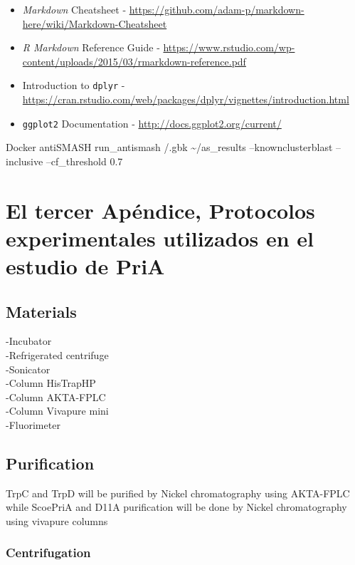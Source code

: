 \documentclass[]{article}
\begin{document}
\begin{itemize}
\item
  \emph{Markdown} Cheatsheet -
  \url{https://github.com/adam-p/markdown-here/wiki/Markdown-Cheatsheet}
\item
  \emph{R Markdown} Reference Guide -
  \url{https://www.rstudio.com/wp-content/uploads/2015/03/rmarkdown-reference.pdf}
\item
  Introduction to \texttt{dplyr} -
  \url{https://cran.rstudio.com/web/packages/dplyr/vignettes/introduction.html}
\item
  \texttt{ggplot2} Documentation -
  \url{http://docs.ggplot2.org/current/}
\end{itemize}

Docker antiSMASH run\_antismash /.gbk \textasciitilde{}/as\_results
--knownclusterblast --inclusive --cf\_threshold 0.7

\section{El tercer Apéndice, Protocolos experimentales utilizados en el
estudio de
PriA}\label{el-tercer-apendice-protocolos-experimentales-utilizados-en-el-estudio-de-pria}

\subsection{Materials}\label{materials}

-Incubator\\
-Refrigerated centrifuge\\
-Sonicator\\
-Column HisTrapHP\\
-Column AKTA-FPLC\\
-Column Vivapure mini\\
-Fluorimeter

\subsection{Purification}\label{purification}

TrpC and TrpD will be purified by Nickel chromatography using AKTA-FPLC
while ScoePriA and D11A purification will be done by Nickel
chromatography using vivapure columns

\subsubsection{Centrifugation}\label{centrifugation}
\end{document}
